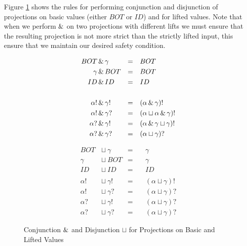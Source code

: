 Figure \ref{fig:conjDisBasic} shows the rules for performing conjunction and
disjunction of projections on basic values (either $BOT$ or $ID$) and for
lifted values. Note that when we perform $\operatorname{\&}$ on two projections with
different lifts we must ensure that the resulting projection is not more strict
than the strictly lifted input, this ensure that we maintain our desired safety
condition.

\begin{figure}
\begin{multicols}{2}
\noindent

\begin{align*}
BOT       &\operatorname{\&}  \gamma        &=&\quad BOT \\
\gamma    &\operatorname{\&}  BOT           &=&\quad BOT \\
ID        &\operatorname{\&}  ID            &=&\quad ID \\
\quad &\             &\ &  \\
\alpha!        &\operatorname{\&}  \gamma!  &=&\quad (\alpha \operatorname{\&} \gamma)! \\
\alpha!        &\operatorname{\&}  \gamma?  &=&\quad (\alpha \sqcup \alpha \operatorname{\&} \gamma)! \\
\alpha?        &\operatorname{\&}  \gamma!  &=&\quad (\alpha \operatorname{\&} \gamma \sqcup \gamma)! \\
\alpha?        &\operatorname{\&}  \gamma?  &=&\quad (\alpha \sqcup \gamma)?
\end{align*}%

\begin{align*}
BOT            &\sqcup\  \gamma   &=&\quad \gamma \\
\gamma         &\sqcup\  BOT      &=&\quad \gamma \\
ID             &\sqcup\  ID       &=&\quad ID \\
\quad \ \quad  &                  &\ & \\
\alpha!        &\sqcup\  \gamma!  &=&\quad (\alpha \sqcup \gamma)! \\
\alpha!        &\sqcup\  \gamma?  &=&\quad (\alpha \sqcup \gamma)? \\
\alpha?        &\sqcup\  \gamma!  &=&\quad (\alpha \sqcup \gamma)? \\
\alpha?        &\sqcup\  \gamma?  &=&\quad (\alpha \sqcup \gamma)?
\end{align*}
\end{multicols}
\caption[Conjunction and Disjunction for Projections 1]{Conjunction $\operatorname{\&}$ and Disjunction $\sqcup$ for Projections on Basic and Lifted Values}
\label{fig:conjDisBasic}
\end{figure}

